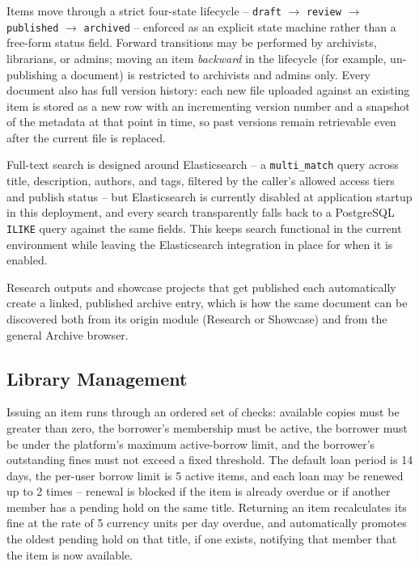 \documentclass[12pt]{article}
\begin{document}
Items move through a strict four-state lifecycle -- \texttt{draft} $\rightarrow$ \texttt{review} $\rightarrow$ \texttt{published} $\rightarrow$ \texttt{archived} -- enforced as an explicit state machine rather than a free-form status field. Forward transitions may be performed by archivists, librarians, or admins; moving an item \emph{backward} in the lifecycle (for example, un-publishing a document) is restricted to archivists and admins only. Every document also has full version history: each new file uploaded against an existing item is stored as a new row with an incrementing version number and a snapshot of the metadata at that point in time, so past versions remain retrievable even after the current file is replaced.

Full-text search is designed around Elasticsearch -- a \texttt{multi\_match} query across title, description, authors, and tags, filtered by the caller's allowed access tiers and publish status -- but Elasticsearch is currently disabled at application startup in this deployment, and every search transparently falls back to a PostgreSQL \texttt{ILIKE} query against the same fields. This keeps search functional in the current environment while leaving the Elasticsearch integration in place for when it is enabled.

Research outputs and showcase projects that get published each automatically create a linked, published archive entry, which is how the same document can be discovered both from its origin module (Research or Showcase) and from the general Archive browser.

\subsection{Library Management}
Issuing an item runs through an ordered set of checks: available copies must be greater than zero, the borrower's membership must be active, the borrower must be under the platform's maximum active-borrow limit, and the borrower's outstanding fines must not exceed a fixed threshold. The default loan period is 14 days, the per-user borrow limit is 5 active items, and each loan may be renewed up to 2 times -- renewal is blocked if the item is already overdue or if another member has a pending hold on the same title. Returning an item recalculates its fine at the rate of 5 currency units per day overdue, and automatically promotes the oldest pending hold on that title, if one exists, notifying that member that the item is now available.
\end{document}
